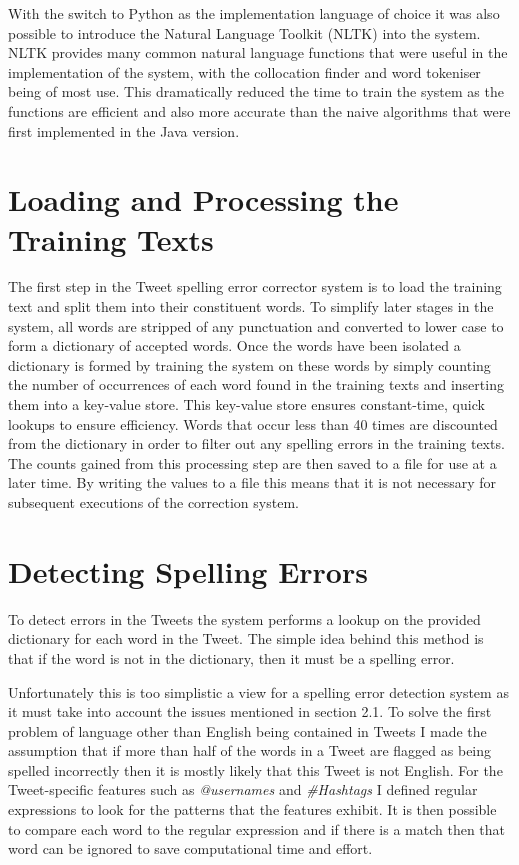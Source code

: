 With the switch to Python as the implementation language of choice it was also possible to introduce the Natural Language Toolkit (NLTK) \cite{} into the system. NLTK provides many common natural language functions that were useful in the implementation of the system, with the collocation finder and word tokeniser being of most use. This dramatically reduced the time to train the system as the functions are efficient and also more accurate than the naive algorithms that were first implemented in the Java version.

\section{Loading and Processing the Training Texts}
The first step in the Tweet spelling error corrector system is to load the training text and split them into their constituent words. To simplify later stages in the system, all words are stripped of any punctuation and converted to lower case to form a dictionary of accepted words. Once the words have been isolated a dictionary is formed by training the system on these words by simply counting the number of occurrences of each word found in the training texts and inserting them into a key-value store. This key-value store ensures constant-time, quick lookups to ensure efficiency. Words that occur less than 40 times are discounted from the dictionary in order to filter out any spelling errors in the training texts. The counts gained from this processing step are then saved to a file for use at a later time. By writing the values to a file this means that it is not necessary for subsequent executions of the correction system.

\section{Detecting Spelling Errors}
To detect errors in the Tweets the system performs a lookup on the provided dictionary for each word in the Tweet. The simple idea behind this method is that if the word is not in the dictionary, then it must be a spelling error.

Unfortunately this is too simplistic a view for a spelling error detection system as it must take into account the issues mentioned in section 2.1. To solve the first problem of language other than English being contained in Tweets I made the assumption that if more than half of the words in a Tweet are flagged as being spelled incorrectly then it is mostly likely that this Tweet is not English. For the Tweet-specific features such as \emph{@usernames} and \emph{\#Hashtags} I defined regular expressions to look for the patterns that the features exhibit. It is then possible to compare each word to the regular expression and if there is a match then that word can be ignored to save computational time and effort.

